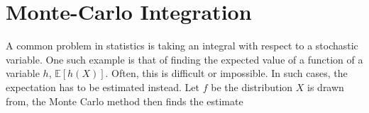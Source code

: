 






\section{Monte-Carlo Integration}
\label{sec: Monte Carlo integration}
A common problem in statistics is taking an integral with respect to a stochastic variable. One such example is that of finding the expected value of a function of a variable $h$, $\mathbb{E}[h(X)]$. Often, this is difficult or impossible. In such cases, the expectation has to be estimated instead. Let $f$ be the distribution $X$ is drawn from, the Monte Carlo method then finds the estimate 

